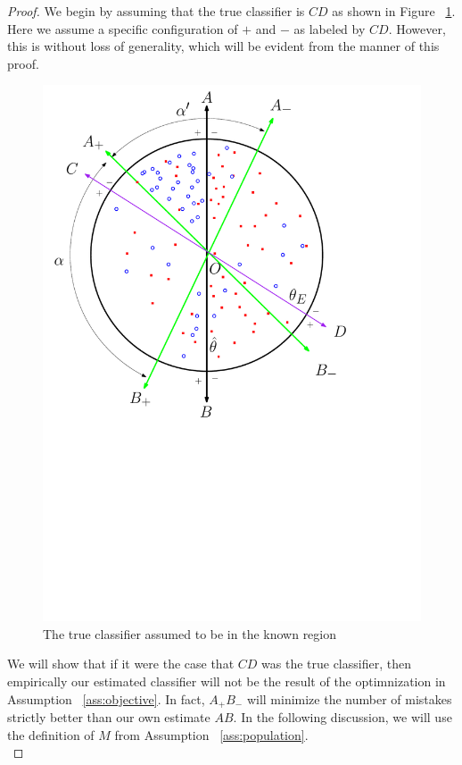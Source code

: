 \begin{proof}
We begin by assuming that the true classifier is $CD$ as shown in Figure ~\ref{fig:true}. Here we assume a specific configuration of $+$ and $-$ as labeled by $CD$. However, this is without loss of generality, which will be evident from the manner of this proof.\\

\begin{figure}[H]
\centering
   \includegraphics[scale=0.5]{texs/true_classifier.pdf}
   \caption{The true classifier assumed to be in the known region}
\label{fig:true}
\end{figure}


We will show that if it were the case that $CD$ was the true classifier, then empirically our estimated classifier will not be the result of the optimnization in Assumption ~\ref{ass:objective}. In fact, $A_+ B_-$ will minimize the number of mistakes strictly better than our own estimate $AB$. In the following discussion, we will use the definition of $M$ from Assumption ~\ref{ass:population}. \\


\end{proof}
